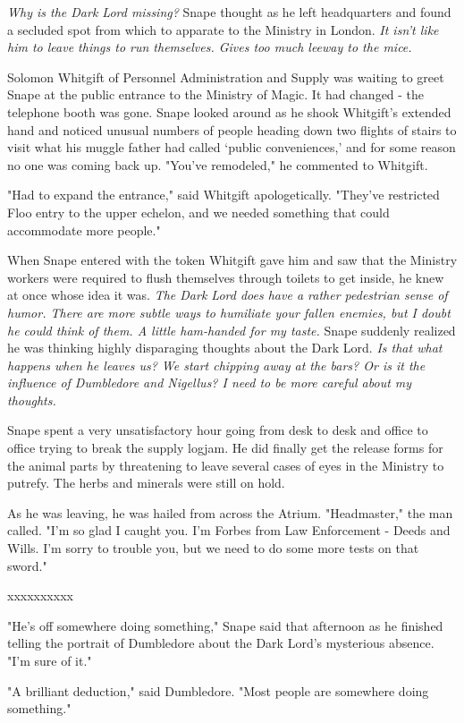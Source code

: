 \documentclass[a4paper,11pt]{article}
\begin{document}
\emph{Why is the Dark Lord missing?} Snape thought as he left headquarters and found a secluded spot from which to apparate to the Ministry in London. \emph{It isn't like him to leave things to run themselves. Gives too much leeway to the mice.}

Solomon Whitgift of Personnel Administration and Supply was waiting to greet Snape at the public entrance to the Ministry of Magic. It had changed - the telephone booth was gone. Snape looked around as he shook Whitgift's extended hand and noticed unusual numbers of people heading down two flights of stairs to visit what his muggle father had called `public conveniences,' and for some reason no one was coming back up. "You've remodeled," he commented to Whitgift.

"Had to expand the entrance," said Whitgift apologetically. "They've restricted Floo entry to the upper echelon, and we needed something that could accommodate more people."

When Snape entered with the token Whitgift gave him and saw that the Ministry workers were required to flush themselves through toilets to get inside, he knew at once whose idea it was. \emph{The Dark Lord does have a rather pedestrian sense of humor. There are more subtle ways to humiliate your fallen enemies, but I doubt he could think of them. A little ham-handed for my taste.} Snape suddenly realized he was thinking highly disparaging thoughts about the Dark Lord. \emph{Is that what happens when he leaves us? We start chipping away at the bars? Or is it the influence of Dumbledore and Nigellus? I need to be more careful about my thoughts.}

Snape spent a very unsatisfactory hour going from desk to desk and office to office trying to break the supply logjam. He did finally get the release forms for the animal parts by threatening to leave several cases of eyes in the Ministry to putrefy. The herbs and minerals were still on hold.

As he was leaving, he was hailed from across the Atrium. "Headmaster," the man called. "I'm so glad I caught you. I'm Forbes from Law Enforcement - Deeds and Wills. I'm sorry to trouble you, but we need to do some more tests on that sword."

xxxxxxxxxx

"He's off somewhere doing something," Snape said that afternoon as he finished telling the portrait of Dumbledore about the Dark Lord's mysterious absence. "I'm sure of it."

"A brilliant deduction," said Dumbledore. "Most people are somewhere doing something."
\end{document}
